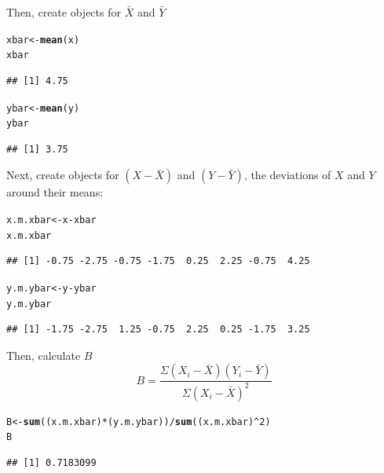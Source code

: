 \documentclass[11pt,openany]{book}\usepackage[]{graphicx}\usepackage[]{color}
\makeatletter
\newcommand{\hlnum}[1]{\textcolor[rgb]{0.686,0.059,0.569}{#1}}%
\newcommand{\hlopt}[1]{\textcolor[rgb]{0,0,0}{#1}}%
\newcommand{\hlstd}[1]{\textcolor[rgb]{0.345,0.345,0.345}{#1}}%
\newcommand{\hlkwb}[1]{\textcolor[rgb]{0.69,0.353,0.396}{#1}}%
\newcommand{\hlkwd}[1]{\textcolor[rgb]{0.737,0.353,0.396}{\textbf{#1}}}%
\newenvironment{kframe}{%
 \def\at@end@of@kframe{}%
 \ifinner\ifhmode%
  \def\at@end@of@kframe{\end{minipage}}%
  \begin{minipage}{\columnwidth}%
 \fi\fi%
 \def\FrameCommand##1{\hskip\@totalleftmargin \hskip-\fboxsep
 \colorbox{shadecolor}{##1}\hskip-\fboxsep
     \hskip-\linewidth \hskip-\@totalleftmargin \hskip\columnwidth}%
 \MakeFramed {\advance\hsize-\width
   \@totalleftmargin\z@ \linewidth\hsize
   \@setminipage}}%
 {\par\unskip\endMakeFramed%
 \at@end@of@kframe}
\newenvironment{knitrout}{}{} %
\renewenvironment{knitrout}{\begin{singlespace}}{\end{singlespace}} %
\makeatother
\begin{document}
\noindent Then, create objects for $\bar {X}$ and $\bar {Y}$

\begin{knitrout}
\color{fgcolor}\begin{kframe}
\begin{alltt}
\hlstd{xbar} \hlkwb{<-} \hlkwd{mean}\hlstd{(x)}
\hlstd{xbar}
\end{alltt}
\begin{verbatim}
## [1] 4.75
\end{verbatim}
\begin{alltt}
\hlstd{ybar} \hlkwb{<-} \hlkwd{mean}\hlstd{(y)}
\hlstd{ybar}
\end{alltt}
\begin{verbatim}
## [1] 3.75
\end{verbatim}
\end{kframe}
\end{knitrout}

\noindent Next, create objects for $(X-\bar X)$ and $(Y-\bar Y)$, the deviations of $X$ and $Y$ around their means:

\begin{knitrout}
\color{fgcolor}\begin{kframe}
\begin{alltt}
\hlstd{x.m.xbar} \hlkwb{<-} \hlstd{x} \hlopt{-} \hlstd{xbar}
\hlstd{x.m.xbar}
\end{alltt}
\begin{verbatim}
## [1] -0.75 -2.75 -0.75 -1.75  0.25  2.25 -0.75  4.25
\end{verbatim}
\begin{alltt}
\hlstd{y.m.ybar} \hlkwb{<-} \hlstd{y} \hlopt{-} \hlstd{ybar}
\hlstd{y.m.ybar}
\end{alltt}
\begin{verbatim}
## [1] -1.75 -2.75  1.25 -0.75  2.25  0.25 -1.75  3.25
\end{verbatim}
\end{kframe}
\end{knitrout}

\noindent Then, calculate $B$
\begin{equation*}
B=\frac{\Sigma(X_{i}-\bar X)(Y_{i}-\bar Y)}{\Sigma(X_{i}-\bar X)^2}
\end{equation*}

\begin{knitrout}
\color{fgcolor}\begin{kframe}
\begin{alltt}
\hlstd{B} \hlkwb{<-} \hlkwd{sum}\hlstd{((x.m.xbar)} \hlopt{*} \hlstd{(y.m.ybar))}\hlopt{/}\hlkwd{sum}\hlstd{((x.m.xbar)}\hlopt{^}\hlnum{2}\hlstd{)}
\hlstd{B}
\end{alltt}
\begin{verbatim}
## [1] 0.7183099
\end{verbatim}
\end{kframe}
\end{knitrout}
\end{document}
